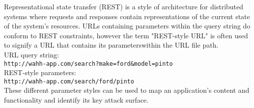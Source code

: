 Representational state transfer (REST) is a style of architecture for distributed systems where requests and responses contain representations of the current state of the system's resources.
URLs containing parameters within the query string do conform to REST constraints, however the term "REST-style URL" is often used to signify a URL that contains its parameterswithin the URL file path.\\
URL query string:\\
\verb|http://wahh-app.com/search?make=ford&model=pinto|\\
REST-style parameters:\\
\verb|http://wahh-app.com/search/ford/pinto|\\
These different parameter styles can be used to map an application's content and functionality and identify its key attack surface.

